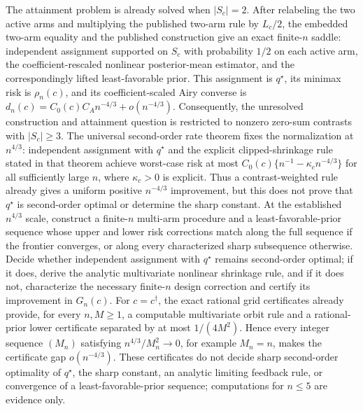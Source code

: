 The attainment problem is already solved when \(|S_c|=2\). After relabeling the two active arms and multiplying the published two-arm rule by \(L_c/2\), the embedded two-arm equality and the published construction give an exact finite-\(n\) saddle: independent assignment supported on \(S_c\) with probability \(1/2\) on each active arm, the coefficient-rescaled nonlinear posterior-mean estimator, and the correspondingly lifted least-favorable prior. This assignment is \(q^\star\), its minimax risk is \(\rho_n(c)\), and its coefficient-scaled Airy converse is \(d_n(c)=C_0(c)C_A n^{-4/3}+o(n^{-4/3})\). Consequently, the unresolved construction and attainment question is restricted to nonzero zero-sum contrasts with \(|S_c|\geq3\). The universal second-order rate theorem fixes the normalization at \(n^{4/3}\): independent assignment with \(q^\star\) and the explicit clipped-shrinkage rule stated in that theorem achieve worst-case risk at most \(C_0(c)\{n^{-1}-\kappa_c n^{-4/3}\}\) for all sufficiently large \(n\), where \(\kappa_c>0\) is explicit. Thus a contrast-weighted rule already gives a uniform positive \(n^{-4/3}\) improvement, but this does not prove that \(q^\star\) is second-order optimal or determine the sharp constant. At the established \(n^{4/3}\) scale, construct a finite-\(n\) multi-arm procedure and a least-favorable-prior sequence whose upper and lower risk corrections match along the full sequence if the frontier converges, or along every characterized sharp subsequence otherwise. Decide whether independent assignment with \(q^\star\) remains second-order optimal; if it does, derive the analytic multivariate nonlinear shrinkage rule, and if it does not, characterize the necessary finite-\(n\) design correction and certify its improvement in \(G_n(c)\). For \(c=c^\dagger\), the exact rational grid certificates already provide, for every \(n,M\geq1\), a computable multivariate orbit rule and a rational-prior lower certificate separated by at most \(1/(4M^2)\). Hence every integer sequence \((M_n)\) satisfying \(n^{4/3}/M_n^2\to0\), for example \(M_n=n\), makes the certificate gap \(o(n^{-4/3})\). These certificates do not decide sharp second-order optimality of \(q^\star\), the sharp constant, an analytic limiting feedback rule, or convergence of a least-favorable-prior sequence; computations for \(n\leq5\) are evidence only.